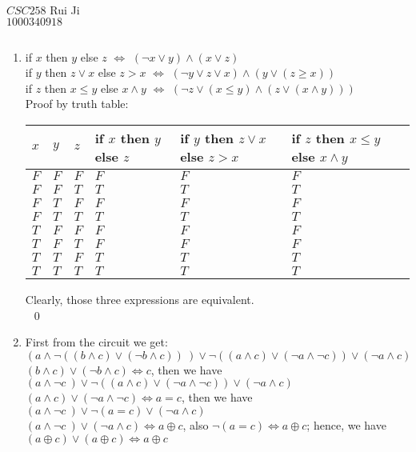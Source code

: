 \documentclass{article}
\begin{document}
\
\\
{\large $CSC258$}
\hfill{\large Rui Ji} \\
\null\hfill{\large $1000340918$}\\
\begin{center} 
\section*{}
\end{center}
\begin{enumerate}
\item if $x$ then $y$ else $z$ $\iff$ $(\neg x \vee y) \wedge (x \vee z)$ \\
	if $y$ then $z \vee x$ else $z>x$  $\iff$ $(\neg y \vee z \vee x) \wedge (y \vee (z \geq x))$\\
	if $z$ then $x \leq y$ else $x \wedge y$ $\iff$ $(\neg z \vee (x \leq y) \wedge (z \vee(x \wedge y)))$\\
Proof by truth table:
 \begin{longtable}{|>{\tiny}p{0.1in}|>{\tiny} p{0.1in}| >{\tiny}p{0.1in}|>{\tiny}p{1.0in}|>{\tiny} p{1.0in}|>{\tiny}p{1.0in}|>{\tiny} p{0.1in}}
\hline
$x$&$y$&$z$&if $x$ then $y$ else $z$&if $y$ then $z \vee x$ else $z>x$ & if $z$ then $x \leq y$ else $x \wedge y$\\[0.1in]\hline
$F$&$F$&$F$&$F$&$F$&$F$\\[0.1in] \hline
$F$&$F$&$T$&$T$&$T$&$T$\\[0.1in] \hline
$F$&$T$&$F$&$F$&$F$&$F$\\[0.1in] \hline
$F$&$T$&$T$&$T$&$T$&$T$\\[0.1in] \hline
$T$&$F$&$F$&$F$&$F$&$F$\\[0.1in] \hline
$T$&$F$&$T$&$F$&$F$&$F$\\[0.1in] \hline
$T$&$T$&$F$&$T$&$T$&$T$\\[0.1in] \hline
$T$&$T$&$T$&$T$&$T$&$T$\\[0.1in] \hline
\end{longtable}
Clearly, those three expressions are equivalent.\\ 
\
\qed
\item First from the  circuit we get: $(a \wedge \neg ( (b \wedge c) \vee ( \neg b \wedge c) ) \ )\vee \neg ((a \wedge c) \vee (\neg a \wedge \neg c))\vee(\neg a  \wedge c)$\\
	$(b \wedge c) \vee ( \neg b \wedge c) \iff c$, then we have $(a \wedge \neg c \ )\vee \neg ((a \wedge c) \vee (\neg a \wedge \neg c))\vee(\neg a  \wedge c)$\\
	$(a \wedge c) \vee (\neg a \wedge \neg c) \iff a =c$, then we have $(a \wedge \neg c \ )\vee \neg (a = c)\vee(\neg a  \wedge c)$\\
	$(a \wedge \neg c \ )\vee (\neg a  \wedge c) \iff a \oplus c$, also  $\neg (a = c) \iff a \oplus c$; hence, we have $(a \oplus c ) \vee (a \oplus c) \iff a \oplus c$\\
	

\end{enumerate}
\end{document}
